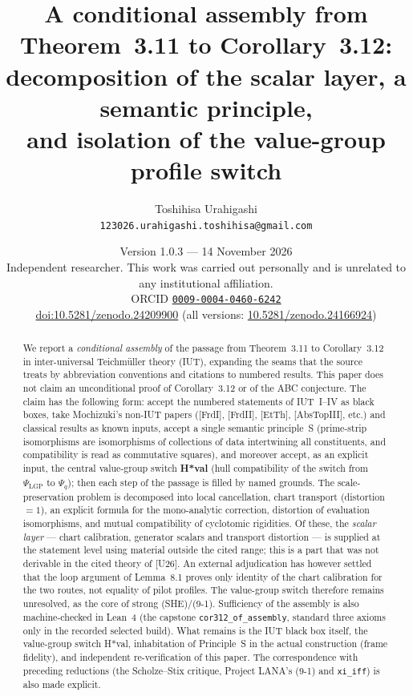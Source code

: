 \documentclass[11pt]{article}
\title{A conditional assembly from Theorem~3.11 to Corollary~3.12:\\
decomposition of the scalar layer, a semantic principle,\\
and isolation of the value-group profile switch}
\author{Toshihisa Urahigashi\\
\small\texttt{123026.urahigashi.toshihisa@gmail.com}}
\date{Version 1.0.3 --- 14 November 2026\\[3pt]
\small Independent researcher. This work was carried out personally and is
unrelated to any institutional affiliation.\\[3pt]
\small ORCID \href{https://orcid.org/0009-0004-0460-6242}{\texttt{0009-0004-0460-6242}}\\[-2pt]
\small \href{https://doi.org/10.5281/zenodo.24209900}{doi:10.5281/zenodo.24209900} (all versions: \href{https://doi.org/10.5281/zenodo.24166924}{10.5281/zenodo.24166924})}
\begin{document}
\maketitle

\begin{abstract}
We report a \emph{conditional assembly} of the passage from
Theorem~3.11 to Corollary~3.12 in inter-universal Teichm\"uller
theory (IUT), expanding the seams that the source treats by
abbreviation conventions and citations to numbered results.  This
paper does not claim an unconditional proof of Corollary~3.12 or of
the ABC conjecture.  The claim has the following form: accept the
numbered statements of IUT~I--IV as black boxes, take Mochizuki's
non-IUT papers ([FrdI], [FrdII], [EtTh], [AbsTopIII], etc.) and
classical results as known inputs, accept a single semantic
principle~S (prime-strip isomorphisms are isomorphisms of
collections of data intertwining all constituents, and compatibility
is read as commutative squares), and moreover accept, as an explicit
input, the central value-group switch \textbf{H*val} (hull
compatibility of the switch from $\Psi_{\mathrm{LGP}}$ to $\Psi_q$);
then each step of the passage is filled by named grounds.  The
scale-preservation problem is decomposed into local cancellation,
chart transport (distortion $=1$), an explicit formula for the
mono-analytic correction, distortion of evaluation isomorphisms, and
mutual compatibility of cyclotomic rigidities.  Of these, the
\emph{scalar layer} --- chart calibration, generator scalars and
transport distortion --- is supplied at the statement level using
material outside the cited range; this is a part that was not
derivable in the cited theory of [U26].  An external adjudication
has however settled that the loop argument of Lemma~8.1 proves only
identity of the chart calibration for the two routes, not equality
of pilot profiles.  The value-group switch therefore remains
unresolved, as the core of strong (SHE)/(9-1).  Sufficiency of the
assembly is also machine-checked in Lean~4 (the capstone
\texttt{cor312\_of\_assembly}, standard three axioms only in the
recorded selected build).  What remains is the IUT black box itself,
the value-group switch H*val, inhabitation of Principle~S in the
actual construction (frame fidelity), and independent re-verification
of this paper.  The correspondence with preceding reductions (the
Scholze--Stix critique, Project LANA's (9-1) and \texttt{xi\_iff}) is
also made explicit.


\end{abstract}
\end{document}
